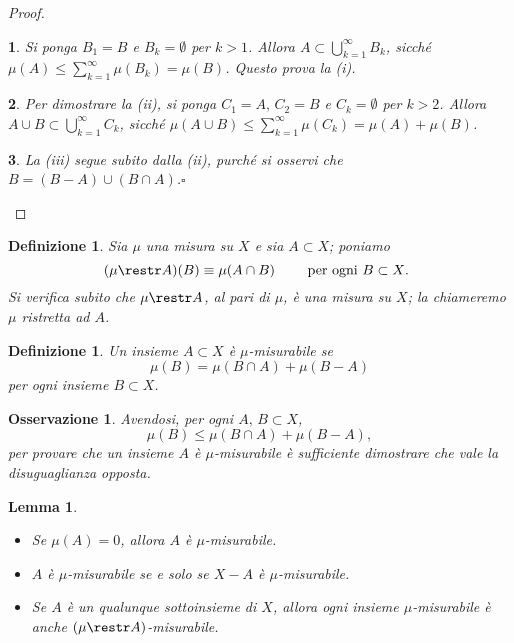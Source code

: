 \documentclass[a4paper,10pt,openright,oneside]{book}
\theoremstyle{theoremstyle}
\newtheorem{lemma}[teorema]{Lemma}
\theoremstyle{theoremstylewoheader}
\theoremstyle{theoremstyle}
\newtheorem{definizione}[teorema]{Definizione}
\newtheorem{osservazione}[teorema]{Osservazione}
\theoremstyle{proofsecstyle}
\newtheorem{proofsec}{}
\theoremstyle{nonumberplain}
\newtheorem{proof}{Dim.}
\renewcommand{\qedsymbol}{\ensuremath{\square}}
\newcommand{\qed}{\unskip\nobreak\hfill\nobreak\hspace{.5em}\qedsymbol}
\begin{document}
\begin{proof}
\begin{proofsec}
Si ponga $B_1 = B$ e $B_k = \emptyset$ per $k > 1$. Allora $A \subset \bigcup_{k=1}^\infty B_k$, sicché $\mu(A) \le \sum_{k=1}^\infty \mu(B_k) = \mu(B)$. Questo prova la (i).
\end{proofsec}

\begin{proofsec}
Per dimostrare la (ii), si ponga $C_1 = A,\, C_2 = B$ e $C_k = \emptyset$ per $k > 2$. Allora $A \cup B \subset \bigcup_{k=1}^\infty C_k$, sicché $\mu(A \cup B) \le \sum_{k=1}^\infty \mu(C_k) = \mu(A) + \mu(B)$.
\end{proofsec}

\begin{proofsec}
La (iii) segue subito dalla (ii), purché si osservi che $B = (B - A) \cup (B \cap A)$.\qed
\end{proofsec}
\end{proof}

\begin{definizione}
\label{def:misura_ristretta}
Sia $\mu$ una misura su $X$ e sia $A \subset X$; poniamo
\[
(\mu \restr A)(B) \equiv \mu(A \cap B)\qquad\text{ per ogni $B \subset X$. }
\]
Si verifica subito che $\mu \restr A$, al pari di $\mu$, è una misura su $X$; la chiameremo \emph{$\mu$ ristretta ad $A$}.
\end{definizione}

\begin{definizione}
\label{def:insieme_misurabile}
Un insieme $A \subset X$ è \emph{$\mu$-misurabile} se
\[
\mu(B) = \mu(B \cap A) + \mu(B - A)
\]
per ogni insieme $B \subset X$.
\end{definizione}

\begin{osservazione}
Avendosi, per ogni $A,\, B \subset X$,
\[
\mu(B) \le \mu(B \cap A) + \mu(B - A),
\]
per provare che un insieme $A$ è $\mu$-misurabile è sufficiente dimostrare che vale la disuguaglianza opposta.
\end{osservazione}

\begin{lemma}
\label{lem:proprieta_elementari_insiemi_misurabili}
\mbox{}
\begin{itemize}
\item[(i)] Se $\mu(A) = 0$, allora $A$ è $\mu$-misurabile.
\item[(ii)] $A$ è $\mu$-misurabile se e solo se $X - A$ è $\mu$-misurabile.
\item[(iii)] Se $A$ è un qualunque sottoinsieme di $X$, allora ogni insieme $\mu$-misurabile è anche $(\mu \restr A)$-misurabile.
\end{itemize}
\end{lemma}
\end{document}
